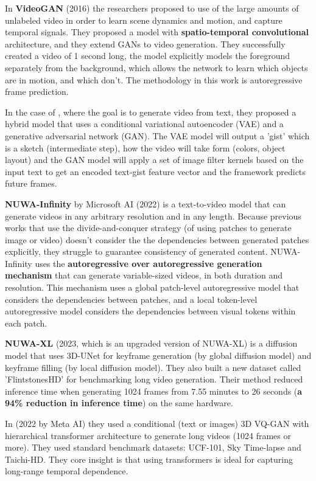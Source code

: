 In \textbf{VideoGAN} \cite{video_gan} (2016) the researchers proposed to use of the large amounts of unlabeled video in order to learn scene dynamics and motion, and capture temporal signals. They proposed a model with \textbf{spatio-temporal convolutional} architecture, and they extend GANs to video generation. They successfully created a video of 1 second long, the model explicitly models the foreground separately from the background, which allows the network to learn which objects are in motion, and which don't. The methodology in this work is autoregressive frame prediction.

In the case of \cite{video_generation_from_text}, where the goal is to generate video from text, they proposed a hybrid model that uses a conditional variational autoencoder (VAE) and a generative adversarial network (GAN). The VAE model will output a 'gist' which is a sketch (intermediate step), how the video will take form (colors, object layout) and the GAN model will apply a set of image filter kernels based on the input text to get an encoded text-gist feature vector and the framework predicts future frames.

\textbf{NUWA-Infinity} \cite{nuwa_infinity} by Microsoft AI (2022) is a text-to-video model that can generate videos in any arbitrary resolution and in any length. Because previous works that use the divide-and-conquer strategy (of using patches to generate image or video) doesn't consider the the dependencies between generated patches explicitly, they struggle to guarantee consistency of generated content. NUWA-Infinity uses the \textbf{autoregressive over autoregressive generation mechanism} that can generate variable-sized videos, in both duration and resolution. This mechanism uses a global patch-level autoregressive
model that considers the dependencies between patches, and a local token-level autoregressive model considers the dependencies between visual tokens within each patch.

\textbf{NUWA-XL} \cite{nuwa_xl} (2023, which is an upgraded version of NUWA-XL) is a diffusion model that uses 3D-UNet for keyframe generation (by global diffusion model) and keyframe filling (by local diffusion model). They also built a new dataset called 'FlintstonesHD' for benchmarking long video generation. Their method reduced inference time when generating 1024 frames from 7.55 minutes to 26 seconds (\textbf{a 94\% reduction in inference time}) on the same hardware.

In \cite{ge2022long} (2022 by Meta AI) they used a conditional (text or images) 3D VQ-GAN with hierarchical transformer architecture to generate long videos (1024 frames or more). They used standard benchmark datasets: UCF-101, Sky Time-lapse and Taichi-HD. They core insight is that using transformers is ideal for capturing long-range temporal dependence.


